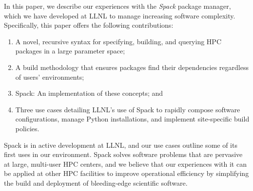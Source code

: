 In this paper, we describe our experiences with the {\it Spack} package manager,
which we have developed at LLNL to manage increasing software complexity.
Specifically, this paper offers the following contributions:
\begin{enumerate}
\item A novel, recursive syntax for specifying, building, and querying
      HPC packages in a large parameter space;
\item A build methodology that ensures packages find their dependencies
      regardless of users' environments; 
\item Spack: An implementation of these concepts; and
\item Three use cases detailing LLNL's use of Spack to rapidly compose
      software configurations, manage Python installations, and implement
      site-specific build policies.
\end{enumerate}

Spack is in active development at LLNL, and our use cases outline some of
its first uses in our environment.  Spack solves software problems that are
pervasive at large, multi-user HPC centers, and we believe that our
experiences with it can be applied at other HPC facilities to improve
operational efficiency by simplifying the build and deployment of 
bleeding-edge scientific software.